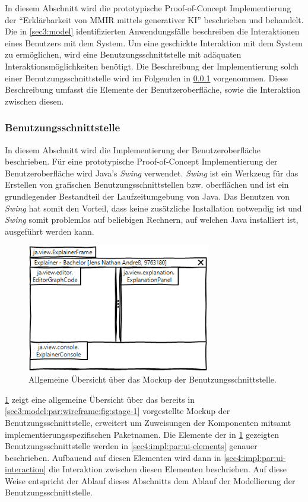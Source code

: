 In diesem Abschnitt wird die prototypische Proof-of-Concept Implementierung der \enquote{Erklärbarkeit von MMIR mittels generativer KI} beschrieben und behandelt.
Die in \cref{sec3:model} identifizierten Anwendungsfälle beschreiben die Interaktionen eines Benutzers mit dem System.
Um eine geschickte Interaktion mit dem System zu ermöglichen, wird eine Benutzungsschnittstelle mit adäquaten Interaktionsmöglichkeiten benötigt.
Die Beschreibung der Implementierung solch einer Benutzungsschnittstelle wird im Folgenden in \cref{sec4:impl:subsubsec:ui} vorgenommen.
Diese Beschreibung umfasst die Elemente der Benutzeroberfläche, sowie die Interaktion zwischen diesen.

\subsubsection{Benutzungsschnittstelle}
\label{sec4:impl:subsubsec:ui}
In diesem Abschnitt wird die Implementierung der Benutzeroberfläche beschrieben.
Für eine prototypische Proof-of-Concept Implementierung der Benutzeroberfläche wird Java's \textit{Swing} verwendet.
\textit{Swing} ist ein Werkzeug für das Erstellen von grafischen Benutzungsschnittstellen bzw. oberflächen und ist ein grundlegender Bestandteil der Laufzeitumgebung von Java.
Das Benutzen von \textit{Swing} hat somit den Vorteil, dass keine zusätzliche Installation notwendig ist und \textit{Swing} somit problemlos auf beliebigen Rechnern, auf welchen Java installiert ist, ausgeführt werden kann.
\begin{figure}[!ht]
  \includegraphics[width=8cm]{chapter/chapter_4/wireframe-impl-overview}
  \caption{Allgemeine Übersicht über das Mockup der Benutzungsschnittstelle.}
  \label{sec4:impl:subsubsec:ui:fig:wireframe-overview}
\end{figure}

\cref{sec4:impl:subsubsec:ui:fig:wireframe-overview} zeigt eine allgemeine Übersicht über das bereits in \cref{sec3:model:par:wireframe:fig:stage-1} vorgestellte Mockup der Benutzungsschnittstelle, erweitert um Zuweisungen der Komponenten mitsamt implementierungsspezifischen Paketnamen.
Die Elemente der in \cref{sec4:impl:subsubsec:ui:fig:wireframe-overview} gezeigten Benutzungsschnittstelle werden in \cref{sec4:impl:par:ui-elements} genauer beschrieben.
Aufbauend auf diesen Elementen wird dann in \cref{sec4:impl:par:ui-interaction} die Interaktion zwischen diesen Elementen beschrieben.
Auf diese Weise entspricht der Ablauf dieses Abschnitts dem Ablauf der Modellierung der Benutzungsschnittstelle.

